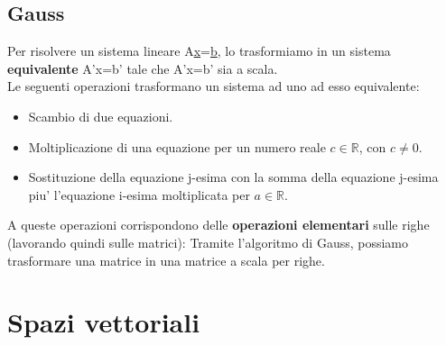 \documentclass{report}
\begin{document}
\section{Gauss}
Per risolvere un sistema lineare A\underline{x}=\underline{b}, lo trasformiamo in un sistema \textbf{equivalente} A'x=b' tale che A'x=b' sia a scala.\\
Le seguenti operazioni trasformano un sistema ad uno ad esso equivalente:
\begin{itemize}
\item Scambio di due equazioni.
  \item Moltiplicazione di una equazione per un numero reale $c\in\mathbb{R}$, con $c\neq0$.
    \item Sostituzione della equazione j-esima con la somma della equazione j-esima piu' l'equazione i-esima moltiplicata per $a\in\mathbb{R}$.
\end{itemize}
A queste operazioni corrispondono delle \textbf{operazioni elementari} sulle righe (lavorando quindi sulle matrici):
Tramite l'algoritmo di Gauss, possiamo trasformare una matrice in una matrice a scala per righe.
\chapter{Spazi vettoriali}
\end{document}
